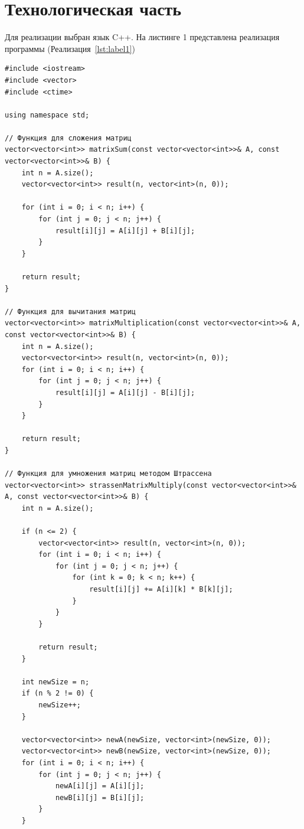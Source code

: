 \documentclass[12pt, a4paper]{article}
\begin{document}
\section{Технологическая часть}
Для реализации выбран язык C++.
На листинге 1 представлена реализация программы
(Реализация~\ref{lst:label1})
\begin{lstlisting}[caption={Исходный код}, label={lst:label1}]
#include <iostream>
#include <vector>
#include <ctime>

using namespace std;

// Функция для сложения матриц
vector<vector<int>> matrixSum(const vector<vector<int>>& A, const vector<vector<int>>& B) {
    int n = A.size();
    vector<vector<int>> result(n, vector<int>(n, 0));

    for (int i = 0; i < n; i++) {
        for (int j = 0; j < n; j++) {
            result[i][j] = A[i][j] + B[i][j];
        }
    }

    return result;
}

// Функция для вычитания матриц
vector<vector<int>> matrixMultiplication(const vector<vector<int>>& A, const vector<vector<int>>& B) {
    int n = A.size();
    vector<vector<int>> result(n, vector<int>(n, 0));
    for (int i = 0; i < n; i++) {
        for (int j = 0; j < n; j++) {
            result[i][j] = A[i][j] - B[i][j];
        }
    }

    return result;
}

// Функция для умножения матриц методом Штрассена
vector<vector<int>> strassenMatrixMultiply(const vector<vector<int>>& A, const vector<vector<int>>& B) {
    int n = A.size();

    if (n <= 2) {
        vector<vector<int>> result(n, vector<int>(n, 0));
        for (int i = 0; i < n; i++) {
            for (int j = 0; j < n; j++) {
                for (int k = 0; k < n; k++) {
                    result[i][j] += A[i][k] * B[k][j];
                }
            }
        }

        return result;
    }

    int newSize = n;
    if (n % 2 != 0) {
        newSize++;
    }

    vector<vector<int>> newA(newSize, vector<int>(newSize, 0));
    vector<vector<int>> newB(newSize, vector<int>(newSize, 0));
    for (int i = 0; i < n; i++) {
        for (int j = 0; j < n; j++) {
            newA[i][j] = A[i][j];
            newB[i][j] = B[i][j];
        }
    }


\end{lstlisting}
\end{document}
